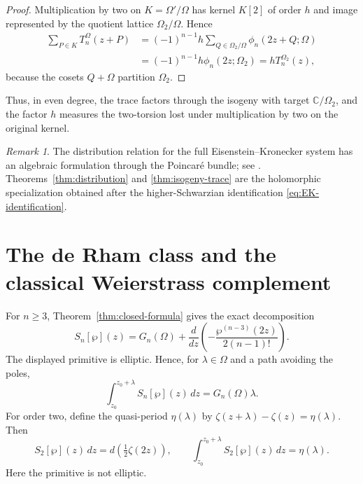 \documentclass[11pt]{amsart}
\theoremstyle{definition}
\theoremstyle{remark}
\newtheorem{remark}[thm]{Remark}
\numberwithin{equation}{section}
\begin{document}
\begin{proof}
Multiplication by two on $K=\Omega'/\Omega$ has kernel $K[2]$ of order $h$
and image represented by the quotient lattice $\Omega_2/\Omega$. Hence
\begin{align*}
\sum_{P\in K}T_n^\Omega(z+P)
&=(-1)^{n-1}h
  \sum_{Q\in\Omega_2/\Omega}\phi_n(2z+Q;\Omega)\\
&=(-1)^{n-1}h\phi_n(2z;\Omega_2)
=hT_n^{\Omega_2}(z),
\end{align*}
because the cosets $Q+\Omega$ partition $\Omega_2$.
\end{proof}

Thus, in even degree, the trace factors through the isogeny with target
$\mathbb C/\Omega_2$, and the factor $h$ measures the two-torsion lost under
multiplication by two on the original kernel.

\begin{remark}
The distribution relation for the full Eisenstein--Kronecker system has an algebraic formulation through the Poincar\'e bundle; see \cite{sprang}. Theorems~\ref{thm:distribution} and \ref{thm:isogeny-trace} are the holomorphic specialization obtained after the higher-Schwarzian identification \eqref{eq:EK-identification}.
\end{remark}

\section{The de Rham class and the classical Weierstrass complement}
\label{sec:derham}

For $n\geq3$, Theorem~\ref{thm:closed-formula} gives the exact decomposition
\begin{equation}\label{eq:exact-decomposition}
S_n[\wp](z)
=G_n(\Omega)+\frac{d}{dz}
\left(-\frac{\wp^{(n-3)}(2z)}{2(n-1)!}\right).
\end{equation}
The displayed primitive is elliptic. Hence, for $\lambda\in\Omega$
and a path avoiding the poles,
\begin{equation}\label{eq:period-general}
\int_{z_0}^{z_0+\lambda}S_n[\wp](z)\,dz=G_n(\Omega)\lambda.
\end{equation}
For order two, define the quasi-period $\eta(\lambda)$ by
$\zeta(z+\lambda)-\zeta(z)=\eta(\lambda)$. Then
\begin{equation}\label{eq:order-two-periods}
S_2[\wp](z)\,dz=d\!\left(\tfrac12\zeta(2z)\right),
\qquad
\int_{z_0}^{z_0+\lambda}S_2[\wp](z)\,dz=\eta(\lambda).
\end{equation}
Here the primitive is not elliptic.
\end{document}
